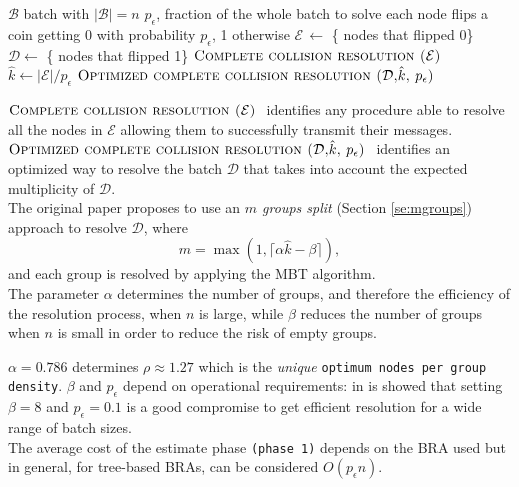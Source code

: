 \documentclass[11pt,a4paper,twoside,openright]{book}
\newcommand{\revv}[1]{{\tt#1}}
\newcommand{\pc}{p_{\epsilon}}
\newcommand{\algname}[1]{\ensuremath{\mbox{\sc #1}}}
\begin{document}
 \begin{algorithm}[h!]
\begin{algorithmic}[1]
	\REQUIRE $\mathcal{B}$ batch with $|\mathcal{B}|=n$
	\REQUIRE $\pc$, fraction of the whole batch to solve
	\STATE {}
	\STATE each node flips a coin getting 0 with probability $\pc$, 1 otherwise
	\STATE $\mathcal{E} \,\gets$ \{ nodes that flipped 0\}
	\STATE $\mathcal{D} \gets$ \{ nodes that flipped 1\}
	\STATE \algname{Complete collision resolution ($\mathcal{E}$) }
	\STATE  $\hat{k} \gets |\mathcal{E}|/\pc$
	\STATE {}
	\STATE \algname{Optimized complete collision resolution ($\mathcal{D}$,$\hat{k}$, $\pc$) }
	\end{algorithmic}
\caption{\algname{Cidon($\mathcal{B}$, $\pc$)}}
\label{alg-cidon}
\end{algorithm}
\noindent\algname{Complete collision resolution ($\mathcal{E}$) } identifies any procedure able to resolve all the nodes in $\mathcal{E}$ allowing them to successfully transmit their messages.\\ \algname{Optimized complete collision resolution ($\mathcal{D}$,$\hat{k}$, $\pc$) } identifies an optimized way to resolve the batch $\mathcal{D}$ that takes into account the expected multiplicity of $\mathcal{D}$.\\
 
 The original paper proposes to use an \emph{$m$ groups split} (Section \ref{se:mgroups}) approach to resolve $\mathcal{D}$, where 
 \begin{equation}
m = \max(1, \lceil\alpha \hat{k}-\beta\rceil),
\end{equation}
and each group is resolved by applying the MBT algorithm.\\
The parameter $\alpha$ determines the number of groups, and therefore the efficiency of the resolution process, when $n$ is large, while $\beta$  reduces the number of groups when $n$ is small in order to reduce the risk of empty groups. 
 
 $\alpha=0.786$ determines $\rho\approx 1.27$ which is the \emph{unique} \revv{optimum  nodes per group density}. $\beta$ and $\pc$ depend on operational requirements: in \cite{cidon} is showed that setting $\beta=8$ and  $\pc=0.1$ is a good compromise to get efficient resolution for a wide range of batch sizes.\\  
 
The average  cost of the estimate phase \revv{(phase 1)} depends on the BRA used but in general, for tree-based BRAs,  can be considered $O(\pc n)$.
\end{document}
